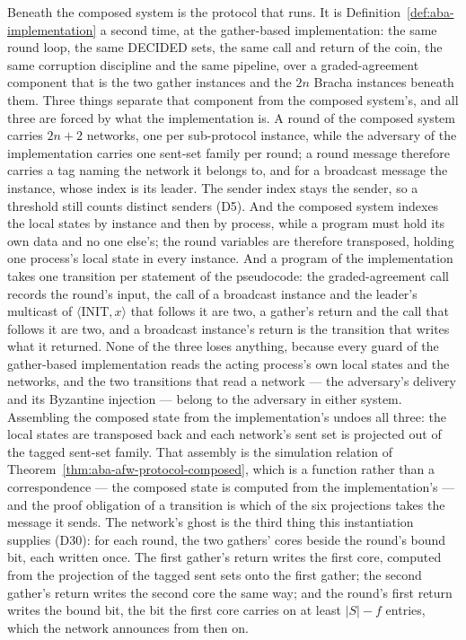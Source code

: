 Beneath the composed system is the protocol that runs.
It is Definition~\ref{def:aba-implementation} a second time, at the gather-based implementation: the same round loop, the same DECIDED sets, the same call and return of the coin, the same corruption discipline and the same pipeline, over a graded-agreement component that is the two gather instances and the $2n$ Bracha instances beneath them.
Three things separate that component from the composed system's, and all three are forced by what the implementation is.
A round of the composed system carries $2n+2$ networks, one per sub-protocol instance, while the adversary of the implementation carries one sent-set family per round; a round message therefore carries a tag naming the network it belongs to, and for a broadcast message the instance, whose index is its leader.
The sender index stays the sender, so a threshold still counts distinct senders (D5).
And the composed system indexes the local states by instance and then by process, while a program must hold its own data and no one else's; the round variables are therefore transposed, holding one process's local state in every instance.
And a program of the implementation takes one transition per statement of the pseudocode: the graded-agreement call records the round's input, the call of a broadcast instance and the leader's multicast of $\langle\mathrm{INIT}, x\rangle$ that follows it are two, a gather's return and the call that follows it are two, and a broadcast instance's return is the transition that writes what it returned.
None of the three loses anything, because every guard of the gather-based implementation reads the acting process's own local states and the networks, and the two transitions that read a network --- the adversary's delivery and its Byzantine injection --- belong to the adversary in either system.
Assembling the composed state from the implementation's undoes all three: the local states are transposed back and each network's sent set is projected out of the tagged sent-set family.
That assembly is the simulation relation of Theorem~\ref{thm:aba-afw-protocol-composed}, which is a function rather than a correspondence --- the composed state is computed from the implementation's --- and the proof obligation of a transition is which of the six projections takes the message it sends.
The network's ghost is the third thing this instantiation supplies (D30): for each round, the two gathers' cores beside the round's bound bit, each written once.
The first gather's return writes the first core, computed from the projection of the tagged sent sets onto the first gather; the second gather's return writes the second core the same way; and the round's first return writes the bound bit, the bit the first core carries on at least $|S| - f$ entries, which the network announces from then on.
